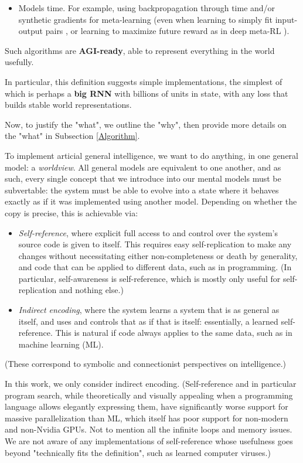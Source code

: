 \documentclass{article}
\begin{document}
\begin{itemize}
\begin{itemize}
\item Models time. For example, using backpropagation through time and/or synthetic gradients for meta-learning (even when learning to simply fit input-output pairs \cite{santoro2016oneshot}, or learning to maximize future reward as in deep meta-RL \cite{DBLP:journals/corr/WangKTSLMBKB16}).
\end{itemize}
\end{itemize}

Such algorithms are \textbf{AGI-ready}, able to represent everything in the world usefully.

In particular, this definition suggests simple implementations, the simplest of which is perhaps a \textbf{big RNN} with billions of units in state, with any loss that builds stable world representations.

Now, to justify the "what", we outline the "why", then provide more details on the "what" in Subsection \ref{Algorithm}.

To implement articial general intelligence, we want to do anything, in one general model: a \textit{worldview}. All general models are equivalent to one another, and as such, every single concept that we introduce into our mental models must be subvertable: the system must be able to evolve into a state where it behaves exactly as if it was implemented using another model. Depending on whether the copy is precise, this is achievable via:

\begin{itemize}
\item \textit{Self-reference}, where explicit full access to and control over the system's source code is given to itself. This requires easy self-replication to make any changes without necessitating either non-completeness or death by generality, and code that can be applied to different data, such as in programming. (In particular, self-awareness is self-reference, which is mostly only useful for self-replication and nothing else.)
\item \textit{Indirect encoding}, where the system learns a system that is as general as itself, and uses and controls that as if that is itself: essentially, a learned self-reference. This is natural if code always applies to the same data, such as in machine learning (ML).
\end{itemize}

(These correspond to symbolic and connectionist perspectives on intelligence.)

In this work, we only consider indirect encoding. (Self-reference and in particular program search, while theoretically and visually appealing when a programming language allows elegantly expressing them, have significantly worse support for massive parallelization than ML, which itself has poor support for non-modern and non-Nvidia GPUs. Not to mention all the infinite loops and memory issues. We are not aware of any implementations of self-reference whose usefulness goes beyond "technically fits the definition", such as learned computer viruses.)
\end{document}
